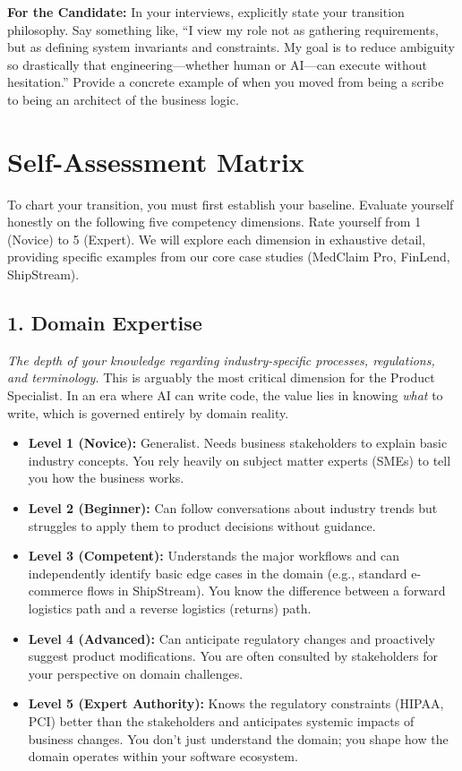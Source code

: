 \documentclass[
  11pt,
  openany,
  oneside]{book}
\providecommand{\tightlist}{%
  \setlength{\itemsep}{0pt}\setlength{\parskip}{0pt}}
\renewenvironment{quote}{\begin{customquote}}{\end{customquote}}
\begin{document}
\begin{quote}
\textbf{For the Candidate:} In your interviews, explicitly state your
transition philosophy. Say something like, ``I view my role not as
gathering requirements, but as defining system invariants and
constraints. My goal is to reduce ambiguity so drastically that
engineering---whether human or AI---can execute without hesitation.''
Provide a concrete example of when you moved from being a scribe to
being an architect of the business logic.
\end{quote}

\bigskip

\section{Self-Assessment Matrix}\label{self-assessment-matrix}

To chart your transition, you must first establish your baseline.
Evaluate yourself honestly on the following five competency dimensions.
Rate yourself from 1 (Novice) to 5 (Expert). We will explore each
dimension in exhaustive detail, providing specific examples from our
core case studies (MedClaim Pro, FinLend, ShipStream).

\subsection{1. Domain Expertise}\label{domain-expertise}

\emph{The depth of your knowledge regarding industry-specific processes,
regulations, and terminology.} This is arguably the most critical
dimension for the Product Specialist. In an era where AI can write code,
the value lies in knowing \emph{what} to write, which is governed
entirely by domain reality.

\begin{itemize}
\tightlist
\item
  \textbf{Level 1 (Novice):} Generalist. Needs business stakeholders to
  explain basic industry concepts. You rely heavily on subject matter
  experts (SMEs) to tell you how the business works.
\item
  \textbf{Level 2 (Beginner):} Can follow conversations about industry
  trends but struggles to apply them to product decisions without
  guidance.
\item
  \textbf{Level 3 (Competent):} Understands the major workflows and can
  independently identify basic edge cases in the domain (e.g., standard
  e-commerce flows in ShipStream). You know the difference between a
  forward logistics path and a reverse logistics (returns) path.
\item
  \textbf{Level 4 (Advanced):} Can anticipate regulatory changes and
  proactively suggest product modifications. You are often consulted by
  stakeholders for your perspective on domain challenges.
\item
  \textbf{Level 5 (Expert Authority):} Knows the regulatory constraints
  (HIPAA, PCI) better than the stakeholders and anticipates systemic
  impacts of business changes. You don't just understand the domain; you
  shape how the domain operates within your software ecosystem.
\end{itemize}
\end{document}

